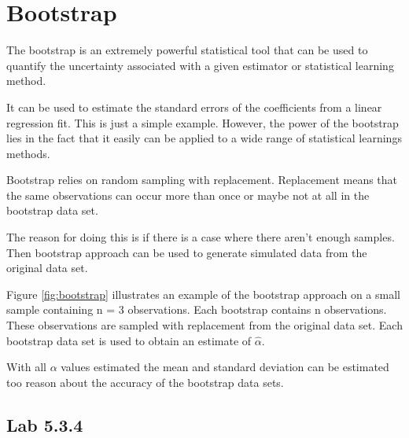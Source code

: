 \chapter{Bootstrap}
\label{chp:boots}

The bootstrap is an extremely powerful statistical tool that can be used to quantify the uncertainty associated with a given estimator or statistical learning method.

It can be used to estimate the standard errors of the coefficients from a linear regression fit. This is just a simple example. However, the power of the bootstrap lies in the fact that it easily can be applied to a wide range of statistical learnings methods.

Bootstrap relies on random sampling with replacement. Replacement means that the same observations can occur more than once or maybe not at all in the bootstrap data set.

The reason for doing this is if there is a case where there aren't enough samples. Then bootstrap approach can be used to generate simulated data from the original data set.


Figure \ref{fig:bootstrap} illustrates an example of the bootstrap approach on a small sample containing n = 3 observations. Each bootstrap contains n observations. These observations are sampled with replacement from the original data set. Each bootstrap data set is used to obtain an estimate of $\hat{\alpha}$.

With all $\alpha$ values estimated the mean and standard deviation can be estimated too reason about the accuracy of the bootstrap data sets.

\section{Lab 5.3.4}

